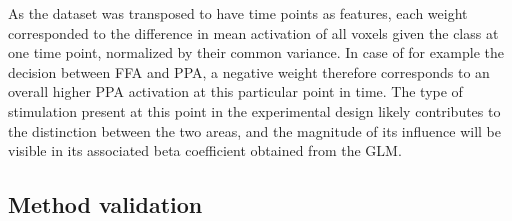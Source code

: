\documentclass[a4paper, 12pt]{scrreprt}
\begin{document}
As the dataset was transposed to have time points as features, each weight corresponded to the difference in mean activation of all voxels given the class at one time point, normalized by their common variance. In case of for example the decision between FFA and PPA, a negative weight therefore corresponds to an overall higher PPA activation at this particular point in time. The type of stimulation present at this point in the experimental design likely contributes to the distinction between the two areas, and the magnitude of its influence will be visible in its associated beta coefficient obtained from the GLM. \newline
 

\subsection{Method validation}\label{section:methodvalidation}
\end{document}
